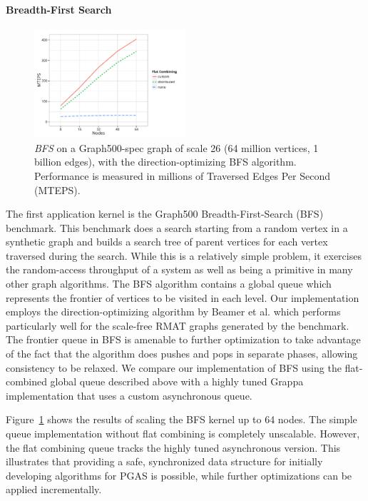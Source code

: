 \paragraph{Breadth-First Search}
\begin{figure}[t]
  \centering
  \includegraphics[width=0.5\textwidth]{data/plots/bfs_perf.pdf}
  \caption{\emph{BFS} on a Graph500-spec graph of scale 26 (64 million vertices, 1 billion edges), with the direction-optimizing BFS algorithm. Performance is measured in millions of Traversed Edges Per Second (MTEPS).}
  \label{fig:bfs_perf}
\end{figure}
The first application kernel is the Graph500 Breadth-First-Search (BFS) benchmark. This benchmark does a search starting from a random vertex in a synthetic graph and builds a search tree of parent vertices for each vertex traversed during the search. While this is a relatively simple problem, it exercises the random-access throughput of a system as well as being a primitive in many other graph algorithms. The BFS algorithm contains a global queue which represents the frontier of vertices to be visited in each level.
Our implementation employs the direction-optimizing algorithm by Beamer et al.\cite{Beamer:Graph500} which performs particularly well for the scale-free RMAT graphs generated by the benchmark.
The frontier queue in BFS is amenable to further optimization to take advantage of the fact that the algorithm does pushes and pops in separate phases, allowing consistency to be relaxed.
We compare our implementation of BFS using the flat-combined global queue described above with a highly tuned Grappa implementation that uses a custom asynchronous queue.

Figure~\ref{fig:bfs_perf} shows the results of scaling the BFS kernel up to 64 nodes. The simple queue implementation without flat combining is completely unscalable. However, the flat combining queue tracks the highly tuned asynchronous version. This illustrates that providing a safe, synchronized data structure for initially developing algorithms for PGAS is possible, while further optimizations can be applied incrementally.

